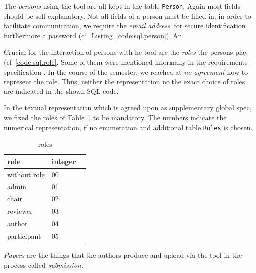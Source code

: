 \medskip{}



The \emph{persons} using the tool are all kept in the table
\texttt{Person}. Again most fields should be self-explanatory. Not all
fields of a person must be filled in; in order to facilitate communication,
we require the \emph{email address}; for secure identification furthermore
a password (cf.\ Listing~\ref{code:sql.person}).  An

%

\medskip{}

Crucial for the interaction of persons with he tool are the \emph{roles}
the persons play (cf~\ref{code.sql.role}. Some of them were mentioned
informally in the requirements specification \cite{coma:requirements}. In
the course of the semester, we reached at \emph{no agreement} how to
represent the role. Thus, neither the representation no the exact choice of
roles are indicated in the shown SQL-code. 

%


In the textual representation which is agreed upon as supplementary global
spec, we fixed the roles of Table~\ref{tab:roles} to be mandatory. The
numbers indicate the numerical representation, if no enumeration and
additional table \texttt{Roles} is chosen.

\begin{table}[htbp]
  \centering
  \begin{tabular}{lll}
    \\
    role & integer
    \\\hline
    without role & 00 
    \\
    admin & 01
    \\
    chair & 02
    \\
    reviewer & 03
    \\
    author & 04
    \\
    participant & 05
    \\
  \end{tabular}
  \caption{roles}
  \label{tab:roles}
\end{table}


\medskip%

\emph{Papers} are the things that the authors produce and upload
via the tool in the process called \emph{submission.}

%

%



%

